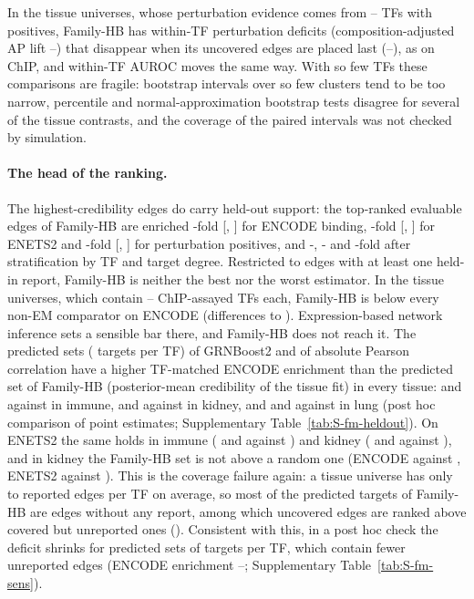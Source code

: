 In the tissue universes, whose perturbation evidence comes from \nTfsPosTisMin{}--\nTfsPosTisMax{} TFs with positives, Family-HB has within-TF perturbation deficits (composition-adjusted AP lift \nAdjHbTisPertMin{}--\nAdjHbTisPertMax{}) that disappear when its uncovered edges are placed last (\nAdjUlTisPertMin{}--\nAdjUlTisPertMax{}), as on ChIP, and within-TF AUROC moves the same way. With so few TFs these comparisons are fragile: bootstrap intervals over so few clusters tend to be too narrow, percentile and normal-approximation bootstrap tests disagree for several of the tissue contrasts, and the coverage of the paired intervals was not checked by simulation.

\paragraph{The head of the ranking.}
The highest-credibility edges do carry held-out support: the \nEvalK{} top-ranked evaluable edges of Family-HB are enriched \nEnrHbEnc{}-fold [\nEnrHbEncLo{}, \nEnrHbEncHi{}] for ENCODE binding, \nEnrHbEnet{}-fold [\nEnrHbEnetLo{}, \nEnrHbEnetHi{}] for ENETS2 and \nEnrHbPert{}-fold [\nEnrHbPertLo{}, \nEnrHbPertHi{}] for perturbation positives, and \nSenrHbEnc{}-, \nSenrHbEnet{}- and \nSenrHbPert{}-fold after stratification by TF and target degree.
Restricted to edges with at least one held-in report, Family-HB is neither the best nor the worst estimator.
In the tissue universes, which contain \nChipTfsTisMin{}--\nChipTfsTisMax{} ChIP-assayed TFs each, Family-HB is below every non-EM comparator on ENCODE (differences \nTisEncDMin{} to \nTisEncDMax{}).
Expression-based network inference sets a sensible bar there, and Family-HB does not reach it.
The predicted sets (\nTopK{} targets per TF) of GRNBoost2 and of absolute Pearson correlation have a higher TF-matched ENCODE enrichment than the predicted set of Family-HB (posterior-mean credibility of the tissue fit) in every tissue: \nPsGbEncImm{} and \nPsPeEncImm{} against \nPsHbEncImm{} in immune, \nPsGbEncKid{} and \nPsPeEncKid{} against \nPsHbEncKid{} in kidney, and \nPsGbEncLung{} and \nPsPeEncLung{} against \nPsHbEncLung{} in lung (post hoc comparison of point estimates; Supplementary Table~\ref{tab:S-fm-heldout}).
On ENETS2 the same holds in immune (\nPsGbEnetImm{} and \nPsPeEnetImm{} against \nPsHbEnetImm{}) and kidney (\nPsGbEnetKid{} and \nPsPeEnetKid{} against \nPsHbEnetKid{}), and in kidney the Family-HB set is not above a random one (ENCODE \nPsHbEncKid{} against \nPsRandEncKid{}, ENETS2 \nPsHbEnetKid{} against \nPsRandEnetKid{}).
This is the coverage failure again: a tissue universe has only \nCtxRepPerTfMin{} to \nCtxRepPerTfMax{} reported edges per TF on average, so most of the \nTopK{} predicted targets of Family-HB are edges without any report, among which uncovered edges are ranked above covered but unreported ones (). Consistent with this, in a post hoc check the deficit shrinks for predicted sets of \nTopKSensLo{} targets per TF, which contain fewer unreported edges (ENCODE enrichment \nPsHbEncLoKMin{}--\nPsHbEncLoKMax{}; Supplementary Table~\ref{tab:S-fm-sens}).

